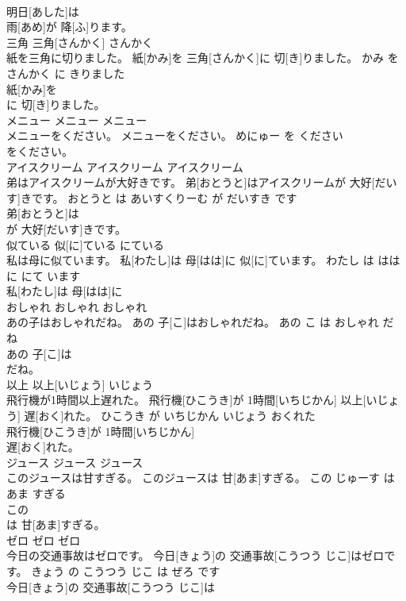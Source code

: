\documentclass[8pt]{extreport}
\begin{document}
\begin{CJK}{UTF8}{min}
\\	明日[あした]は
\\	雨[あめ]が 降[ふ]ります。			
\\	三角	三角[さんかく]	さんかく	
\\	紙を三角に切りました。	紙[かみ]を 三角[さんかく]に 切[き]りました。	かみ を さんかく に きりました	
\\	紙[かみ]を
\\	に 切[き]りました。			
\\	メニュー	メニュー	メニュー	
\\	メニューをください。	メニューをください。	めにゅー を ください	
\\	をください。			
\\	アイスクリーム	アイスクリーム	アイスクリーム	
\\	弟はアイスクリームが大好きです。	弟[おとうと]はアイスクリームが 大好[だいす]きです。	おとうと は あいすくりーむ が だいすき です	
\\	弟[おとうと]は
\\	が 大好[だいす]きです。			
\\	似ている	似[に]ている	にている	
\\	私は母に似ています。	私[わたし]は 母[はは]に 似[に]ています。	わたし は はは に にて います	
\\	私[わたし]は 母[はは]に
\\	おしゃれ	おしゃれ	おしゃれ	
\\	あの子はおしゃれだね。	あの 子[こ]はおしゃれだね。	あの こ は おしゃれ だ ね	
\\	あの 子[こ]は
\\	だね。			
\\	以上	以上[いじょう]	いじょう	
\\	飛行機が1時間以上遅れた。	飛行機[ひこうき]が 1時間[いちじかん] 以上[いじょう] 遅[おく]れた。	ひこうき が いちじかん いじょう おくれた	
\\	飛行機[ひこうき]が 1時間[いちじかん]
\\	遅[おく]れた。			
\\	ジュース	ジュース	ジュース	
\\	このジュースは甘すぎる。	このジュースは 甘[あま]すぎる。	この じゅーす は あま すぎる	
\\	この
\\	は 甘[あま]すぎる。			
\\	ゼロ	ゼロ	ゼロ	
\\	今日の交通事故はゼロです。	今日[きょう]の 交通事故[こうつう じこ]はゼロです。	きょう の こうつう じこ は ぜろ です	
\\	今日[きょう]の 交通事故[こうつう じこ]は

\end{CJK}
\end{document}
